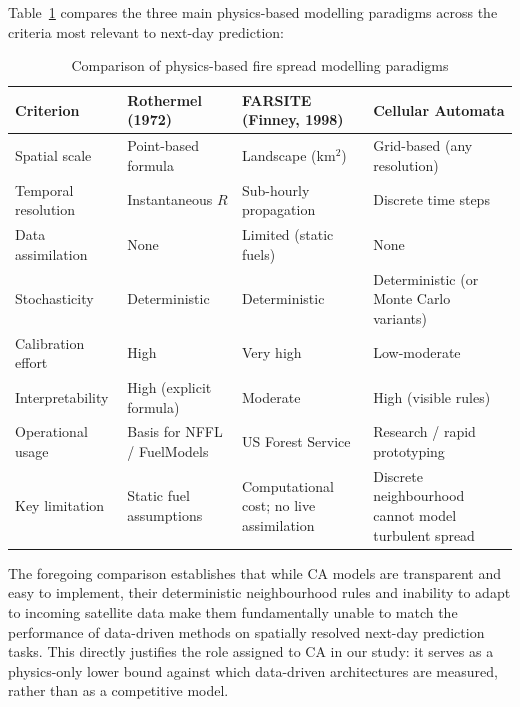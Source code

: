 Table~\ref{tab:physical_model_comparison} compares the three main physics-based modelling paradigms across the criteria most relevant to next-day prediction:

\begin{table}[H]
    \centering
    \caption{Comparison of physics-based fire spread modelling paradigms}
    \label{tab:physical_model_comparison}
    \renewcommand{\arraystretch}{1.3}
    \begin{tabular}{|l|p{3.2cm}|p{3.2cm}|p{3.2cm}|}
        \hline
        \textbf{Criterion} & \textbf{Rothermel (1972)} & \textbf{FARSITE (Finney, 1998)} & \textbf{Cellular Automata} \\
        \hline\hline
        Spatial scale & Point-based formula & Landscape (km$^2$) & Grid-based (any resolution) \\
        \hline
        Temporal resolution & Instantaneous $R$ & Sub-hourly propagation & Discrete time steps \\
        \hline
        Data assimilation & None & Limited (static fuels) & None \\
        \hline
        Stochasticity & Deterministic & Deterministic & Deterministic (or Monte Carlo variants) \\
        \hline
        Calibration effort & High & Very high & Low-moderate \\
        \hline
        Interpretability & High (explicit formula) & Moderate & High (visible rules) \\
        \hline
        Operational usage & Basis for NFFL / FuelModels & US Forest Service & Research / rapid prototyping \\
        \hline
        Key limitation & Static fuel assumptions & Computational cost; no live assimilation & Discrete neighbourhood cannot model turbulent spread \\
        \hline
    \end{tabular}
\end{table}

The foregoing comparison establishes that while CA models are transparent and easy to implement, their deterministic neighbourhood rules and inability to adapt to incoming satellite data make them fundamentally unable to match the performance of data-driven methods on spatially resolved next-day prediction tasks.
This directly justifies the role assigned to CA in our study: it serves as a physics-only lower bound against which data-driven architectures are measured, rather than as a competitive model.

